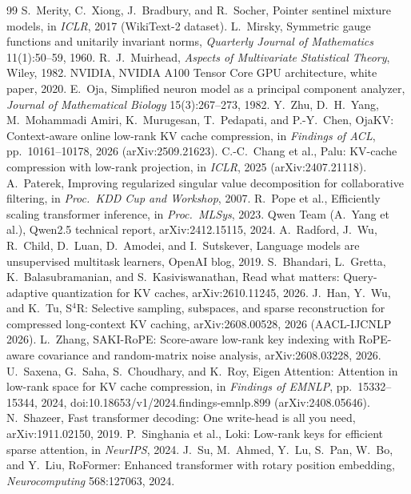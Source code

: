 \documentclass[10pt]{article}
\theoremstyle{plain}
\theoremstyle{definition}
\theoremstyle{remark}
\begin{document}
{\begin{thebibliography}{99}
 S.~Merity, C.~Xiong, J.~Bradbury, and R.~Socher, Pointer sentinel mixture models, in \emph{ICLR}, 2017 (WikiText-2 dataset).
 L.~Mirsky, Symmetric gauge functions and unitarily invariant norms, \emph{Quarterly Journal of Mathematics} 11(1):50--59, 1960.
 R.~J.~Muirhead, \emph{Aspects of Multivariate Statistical Theory}, Wiley, 1982.
 NVIDIA, NVIDIA A100 Tensor Core GPU architecture, white paper, 2020.
 E.~Oja, Simplified neuron model as a principal component analyzer, \emph{Journal of Mathematical Biology} 15(3):267--273, 1982.
 Y.~Zhu, D.~H.~Yang, M.~Mohammadi Amiri, K.~Murugesan, T.~Pedapati, and P.-Y.~Chen, OjaKV: Context-aware online low-rank KV cache compression, in \emph{Findings of ACL}, pp.~10161--10178, 2026 (arXiv:2509.21623).
 C.-C.~Chang et al., Palu: KV-cache compression with low-rank projection, in \emph{ICLR}, 2025 (arXiv:2407.21118).
 A.~Paterek, Improving regularized singular value decomposition for collaborative filtering, in \emph{Proc.\ KDD Cup and Workshop}, 2007.
 R.~Pope et al., Efficiently scaling transformer inference, in \emph{Proc.\ MLSys}, 2023.
 Qwen Team (A.~Yang et al.), Qwen2.5 technical report, arXiv:2412.15115, 2024.
 A.~Radford, J.~Wu, R.~Child, D.~Luan, D.~Amodei, and I.~Sutskever, Language models are unsupervised multitask learners, OpenAI blog, 2019.
 S.~Bhandari, L.~Gretta, K.~Balasubramanian, and S.~Kasiviswanathan, Read what matters: Query-adaptive quantization for KV caches, arXiv:2610.11245, 2026.
 J.~Han, Y.~Wu, and K.~Tu, S$^4$R: Selective sampling, subspaces, and sparse reconstruction for compressed long-context KV caching, arXiv:2608.00528, 2026 (AACL-IJCNLP 2026).
 L.~Zhang, SAKI-RoPE: Score-aware low-rank key indexing with RoPE-aware covariance and random-matrix noise analysis, arXiv:2608.03228, 2026.
 U.~Saxena, G.~Saha, S.~Choudhary, and K.~Roy, Eigen Attention: Attention in low-rank space for KV cache compression, in \emph{Findings of EMNLP}, pp.~15332--15344, 2024, doi:10.18653/v1/2024.findings-emnlp.899 (arXiv:2408.05646).
 N.~Shazeer, Fast transformer decoding: One write-head is all you need, arXiv:1911.02150, 2019.
 P.~Singhania et al., Loki: Low-rank keys for efficient sparse attention, in \emph{NeurIPS}, 2024.
 J.~Su, M.~Ahmed, Y.~Lu, S.~Pan, W.~Bo, and Y.~Liu, RoFormer: Enhanced transformer with rotary position embedding, \emph{Neurocomputing} 568:127063, 2024.

\end{thebibliography}}
\end{document}
